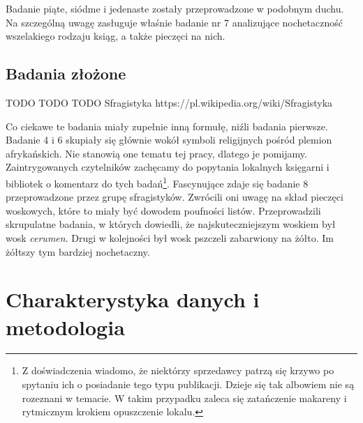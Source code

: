 Badanie piąte, siódme i jedenaste zostały przeprowadzone w podobnym duchu. Na szczególną uwagę zasługuje właśnie badanie nr 7 analizujące nochetaczność wszelakiego rodzaju ksiąg, a także pieczęci na nich.  

\subsection{Badania złożone}

TODO TODO TODO Sfragistyka https://pl.wikipedia.org/wiki/Sfragistyka



Co ciekawe te badania miały zupełnie inną formułę, niźli badania pierwsze. Badanie 4 i 6 skupiały się głównie wokół symboli religijnych pośród plemion afrykańskich.
Nie stanowią one tematu tej pracy, dlatego je pomijamy. Zaintrygowanych czytelników zachęcamy do popytania lokalnych księgarni i bibliotek o komentarz do tych badań\footnote{Z doświadczenia wiadomo, że niektórzy sprzedawcy patrzą się krzywo po spytaniu ich o posiadanie tego typu publikacji. Dzieje się tak albowiem nie są rozeznani w temacie. W takim przypadku zaleca się zatańczenie makareny i rytmicznym krokiem opuszczenie lokalu.}. Fascynujące zdaje się badanie 8 przeprowadzone przez grupę sfragistyków. Zwrócili oni uwagę na skład pieczęci woskowych, które to miały być dowodem poufności listów. Przeprowadzili skrupulatne badania, w których dowiedli, że najskuteczniejszym woskiem był wosk \textit{cerumen}. Drugi w kolejności był wosk pszczeli zabarwiony na żółto. Im żółtszy tym bardziej nochetaczny.  

\section{Charakterystyka danych i metodologia}


